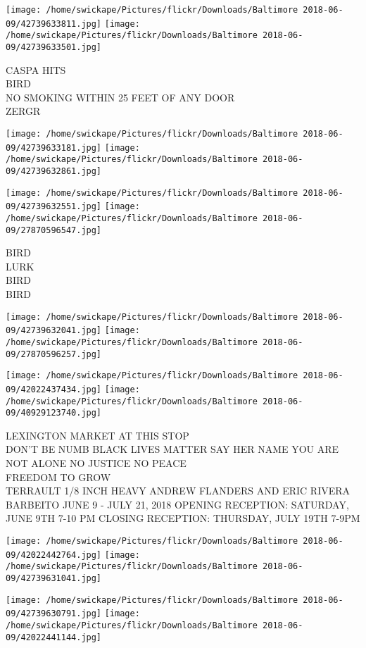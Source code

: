\documentclass[10pt,letterpaper]{article}
\begin{document}
\texttt{[image: /home/swickape/Pictures/flickr/Downloads/Baltimore 2018-06-09/42739633811.jpg]}
\texttt{[image: /home/swickape/Pictures/flickr/Downloads/Baltimore 2018-06-09/42739633501.jpg]}

CASPA HITS\\
BIRD\\
NO SMOKING WITHIN 25 FEET OF ANY DOOR\\
ZERGR
\pagebreak

\texttt{[image: /home/swickape/Pictures/flickr/Downloads/Baltimore 2018-06-09/42739633181.jpg]}
\texttt{[image: /home/swickape/Pictures/flickr/Downloads/Baltimore 2018-06-09/42739632861.jpg]}

\texttt{[image: /home/swickape/Pictures/flickr/Downloads/Baltimore 2018-06-09/42739632551.jpg]}
\texttt{[image: /home/swickape/Pictures/flickr/Downloads/Baltimore 2018-06-09/27870596547.jpg]}

BIRD\\
LURK\\
BIRD\\
BIRD
\pagebreak

\texttt{[image: /home/swickape/Pictures/flickr/Downloads/Baltimore 2018-06-09/42739632041.jpg]}
\texttt{[image: /home/swickape/Pictures/flickr/Downloads/Baltimore 2018-06-09/27870596257.jpg]}

\texttt{[image: /home/swickape/Pictures/flickr/Downloads/Baltimore 2018-06-09/42022437434.jpg]}
\texttt{[image: /home/swickape/Pictures/flickr/Downloads/Baltimore 2018-06-09/40929123740.jpg]}

LEXINGTON MARKET AT THIS STOP\\
DON'T BE NUMB BLACK LIVES MATTER SAY HER NAME YOU ARE NOT ALONE NO JUSTICE NO PEACE\\
FREEDOM TO GROW\\
TERRAULT 1/8 INCH HEAVY ANDREW FLANDERS AND ERIC RIVERA BARBEITO JUNE 9 {-} JULY 21, 2018 OPENING RECEPTION: SATURDAY, JUNE 9TH 7{-}10 PM CLOSING RECEPTION: THURSDAY, JULY 19TH 7{-}9PM
\pagebreak

\texttt{[image: /home/swickape/Pictures/flickr/Downloads/Baltimore 2018-06-09/42022442764.jpg]}
\texttt{[image: /home/swickape/Pictures/flickr/Downloads/Baltimore 2018-06-09/42739631041.jpg]}

\texttt{[image: /home/swickape/Pictures/flickr/Downloads/Baltimore 2018-06-09/42739630791.jpg]}
\texttt{[image: /home/swickape/Pictures/flickr/Downloads/Baltimore 2018-06-09/42022441144.jpg]}
\end{document}
